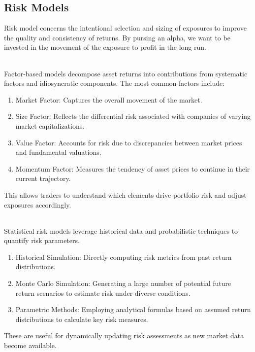 \subsection{Risk Models}

Risk model concerns the intentional selection and sizing of exposures to improve the quality and consistency of returns. By pursing an alpha, we want to be invested in the movement of the exposure to profit in the long run.

\begin{method} \\
Factor-based models decompose asset returns into contributions from systematic factors and idiosyncratic components. The most common factors include:
\begin{enumerate}[label=\roman*.]
\setlength{\itemsep}{0pt}
\item Market Factor: Captures the overall movement of the market.
\item Size Factor: Reflects the differential risk associated with companies of varying market capitalizations.
\item Value Factor: Accounts for risk due to discrepancies between market prices and fundamental valuations.
\item Momentum Factor: Measures the tendency of asset prices to continue in their current trajectory.
\end{enumerate}
This allows traders to understand which elements drive portfolio risk and adjust exposures accordingly.
\end{method}

\begin{method} \\
Statistical risk models leverage historical data and probabilistic techniques to quantify risk parameters.
\begin{enumerate}[label=\roman*.]
\setlength{\itemsep}{0pt}
\item Historical Simulation: Directly computing risk metrics from past return distributions.
\item Monte Carlo Simulation: Generating a large number of potential future return scenarios to estimate risk under diverse conditions.
\item Parametric Methods: Employing analytical formulas based on assumed return distributions to calculate key risk measures.
\end{enumerate}
These are useful for dynamically updating risk assessments as new market data become available.
\end{method}

